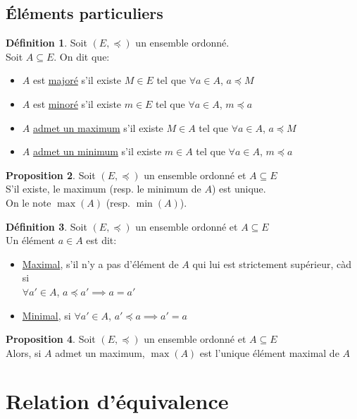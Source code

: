 \documentclass[10pt,a4paper]{article}
\theoremstyle{definition}
\newtheorem{proposition}{Proposition}[section]
\newtheorem{definition}[proposition]{Définition}
\begin{document}
\subsection{Éléments particuliers}
\begin{definition}
Soit $(E, \preccurlyeq)$ un ensemble ordonné. \\
Soit $A \subseteq E$. On dit que:
\begin{itemize}
\item $A$ est \uline{majoré} s'il existe $M \in E$ tel que $\forall a \in A$, $a \preccurlyeq M$
\item $A$ est \uline{minoré} s'il existe $m \in E$ tel que $\forall a \in A$, $m \preccurlyeq a$
\item $A$ \uline{admet un maximum} s'il existe $M \in A$ tel que $\forall a \in A$, $a \preccurlyeq M$
\item $A$ \uline{admet un minimum} s'il existe $m \in A$ tel que $\forall a \in A$, $m \preccurlyeq a$
\end{itemize}
\end{definition}
\begin{proposition}
Soit $(E, \preccurlyeq)$ un ensemble ordonné et $A \subseteq E$ \\
S'il existe, le maximum (resp. le minimum de $A$) est unique. \\
On le note $\max(A)$ (resp. $\min(A)$).
\end{proposition}
\begin{definition}
Soit $(E, \preccurlyeq)$ un ensemble ordonné et $A \subseteq E$ \\
Un élément $a \in A$ est dit:
\begin{itemize}
\item \uline{Maximal}, s'il n'y a pas d'élément de $A$ qui lui est strictement supérieur, càd si \\
$\forall a' \in A$, $a \preccurlyeq a' \implies a = a'$
\item \uline{Minimal}, si $\forall a' \in A$, $a' \preccurlyeq a \implies a' = a$
\end{itemize}
\end{definition}
\begin{proposition}
Soit $(E, \preccurlyeq)$ un ensemble ordonné et $A \subseteq E$ \\
Alors, si $A$ admet un maximum, $\max(A)$ est l'unique élément maximal de $A$
\end{proposition}

\pagebreak

\section{Relation d'équivalence}
\end{document}
